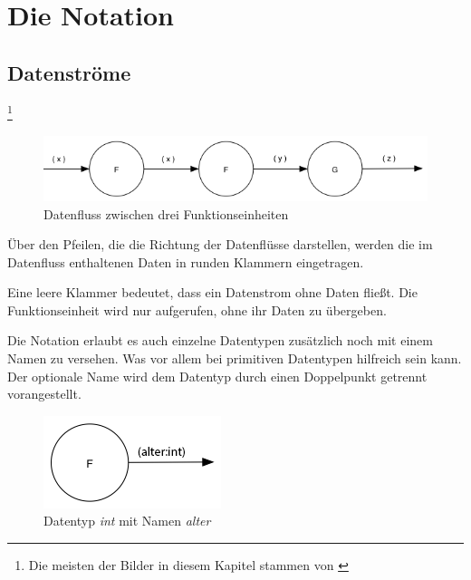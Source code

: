 \newcommand\blfootnote[1]{%
	\begingroup
	\renewcommand\thefootnote{}\footnote{#1}%
	\addtocounter{footnote}{-1}%
	\endgroup
}

\chapter{Die Notation}

\section{Datenströme}

 \blfootnote{Die meisten der Bilder in diesem Kapitel stammen von \cite{flowdesignorg}}
 
\begin{figure}[H]
	\includegraphics[width=1\linewidth]{./img/diagram1.png}
	\caption{Datenfluss zwischen drei Funktionseinheiten}
\end{figure}






Über den Pfeilen, die die Richtung der Datenflüsse darstellen, werden die im
Datenfluss enthaltenen Daten in runden Klammern eingetragen.

Eine leere Klammer bedeutet, dass ein Datenstrom ohne Daten fließt.
Die Funktionseinheit wird nur aufgerufen, ohne ihr Daten zu übergeben.


Die Notation erlaubt es auch einzelne Datentypen zusätzlich noch mit einem Namen zu versehen. Was vor allem bei primitiven Datentypen hilfreich sein kann. 
Der optionale Name wird dem Datentyp durch einen Doppelpunkt getrennt vorangestellt.

\begin{figure}[H]
	\centering
	\includegraphics[width=.4\linewidth]{./img/diagramNamedType.png}
	\caption{Datentyp \textit{int} mit Namen \textit{alter}}
\end{figure}


